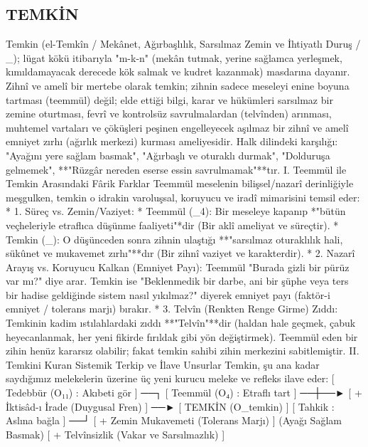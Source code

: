\documentclass[11pt,a4paper]{article}
\begin{document}
\subsection{TEMKİN}



Temkin (el-Temkîn / Mekânet, Ağırbaşlılık, Sarsılmaz Zemin ve İhtiyatlı Duruş / _{}); lügat kökü itibarıyla "m-k-n" (mekân tutmak, yerine sağlamca yerleşmek, kımıldamayacak derecede kök salmak ve kudret kazanmak) masdarına dayanır.
Zihnî ve amelî bir mertebe olarak temkin; zihnin sadece meseleyi enine boyuna tartması (teemmül) değil; elde ettiği bilgi, karar ve hükümleri sarsılmaz bir zemine oturtması, fevrî ve kontrolsüz savrulmalardan (telvînden) arınması, muhtemel vartaları ve çöküşleri peşinen engelleyecek aşılmaz bir zihnî ve amelî emniyet zırhı (ağırlık merkezi) kurması ameliyesidir.
Halk dilindeki karşılığı: "Ayağını yere sağlam basmak", "Ağırbaşlı ve oturaklı durmak", "Dolduruşa gelmemek", **"Rüzgâr nereden eserse essin savrulmamak"**tır.
I. Teemmül ile Temkin Arasındaki Fârik Farklar
Teemmül meselenin bilişsel/nazarî derinliğiyle meşgulken, temkin o idrakin varoluşsal, koruyucu ve iradî mimarisini temsil eder:
 * 1. Süreç vs. Zemin/Vaziyet:
   * Teemmül (_4): Bir meseleye kapanıp *"bütün veçheleriyle etraflıca düşünme faaliyeti"*dir (Bir aklî ameliyat ve süreçtir).
   * Temkin (_{}): O düşünceden sonra zihnin ulaştığı **"sarsılmaz oturaklılık hali, sükûnet ve mukavemet zırhı"**dır (Bir zihnî vaziyet ve karakterdir).
 * 2. Nazarî Arayış vs. Koruyucu Kalkan (Emniyet Payı):
   Teemmül "Burada gizli bir pürüz var mı?" diye arar. Temkin ise "Beklenmedik bir darbe, ani bir şüphe veya ters bir hadise geldiğinde sistem nasıl yıkılmaz?" diyerek emniyet payı (faktör-i emniyet / tolerans marjı) bırakır.
 * 3. Telvîn (Renkten Renge Girme) Zıddı:
   Temkinin kadim ıstılahlardaki zıddı **"Telvîn"**dir (haldan hale geçmek, çabuk heyecanlanmak, her yeni fikirde fırıldak gibi yön değiştirmek). Teemmül eden bir zihin henüz kararsız olabilir; fakat temkin sahibi zihin merkezini sabitlemiştir.
II. Temkini Kuran Sistemik Terkip ve İlave Unsurlar
Temkin, şu ana kadar saydığımız melekelerin üzerine üç yeni kurucu meleke ve refleks ilave eder:
[ Tedebbür (O₁₁) : Akıbeti gör ] ──┐
[ Teemmül (O₄)   : Etraflı tart ]  ──┼──► [ + İktisâd-ı İrade (Duygusal Fren)   ] ──► [ TEMKİN (O_temkin) ]
[ Tahkik         : Aslına bağla ]  ──┘    [ + Zemin Mukavemeti (Tolerans Marjı) ]      (Ayağı Sağlam Basmak)
                                          [ + Telvînsizlik (Vakar ve Sarsılmazlık) ]
\end{document}
